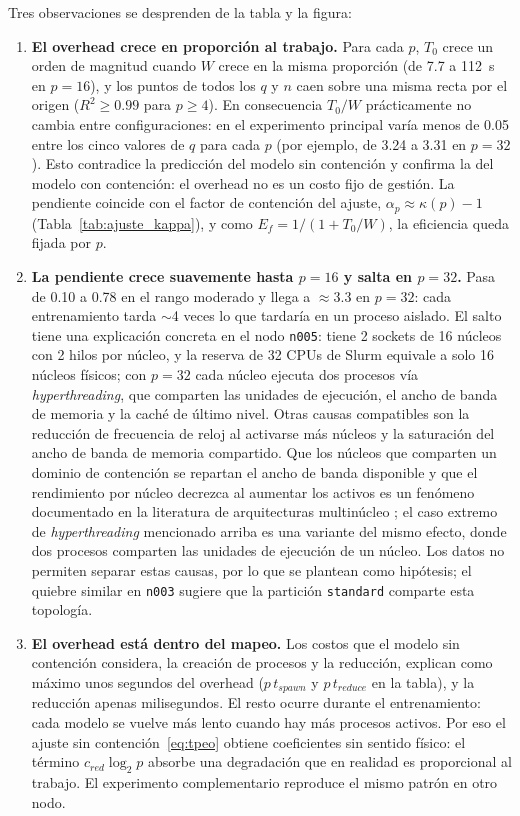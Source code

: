 \documentclass[11pt, a4paper]{article}
\begin{document}
Tres observaciones se desprenden de la tabla y la figura:

\begin{enumerate}
    \item \textbf{El overhead crece en proporción al trabajo.} Para cada $p$, $T_0$ crece un orden de magnitud cuando $W$ crece en la misma proporción (de 7.7 a 112~s en $p=16$), y los puntos de todos los $q$ y $n$ caen sobre una misma recta por el origen ($R^2 \ge 0.99$ para $p \ge 4$). En consecuencia $T_0/W$ prácticamente no cambia entre configuraciones: en el experimento principal varía menos de 0.05 entre los cinco valores de $q$ para cada $p$ (por ejemplo, de 3.24 a 3.31 en $p = 32$). Esto contradice la predicción del modelo sin contención y confirma la del modelo con contención: el overhead no es un costo fijo de gestión. La pendiente coincide con el factor de contención del ajuste, $\alpha_p \approx \kappa(p)-1$ (Tabla~\ref{tab:ajuste_kappa}), y como $E_f = 1/(1+T_0/W)$, la eficiencia queda fijada por $p$.
    \item \textbf{La pendiente crece suavemente hasta $p = 16$ y salta en $p = 32$.} Pasa de 0.10 a 0.78 en el rango moderado y llega a $\approx 3.3$ en $p = 32$: cada entrenamiento tarda $\sim$4 veces lo que tardaría en un proceso aislado. El salto tiene una explicación concreta en el nodo \texttt{n005}: tiene 2 sockets de 16 núcleos con 2 hilos por núcleo, y la reserva de 32 CPUs de Slurm equivale a solo 16 núcleos físicos; con $p = 32$ cada núcleo ejecuta dos procesos vía \textit{hyperthreading}, que comparten las unidades de ejecución, el ancho de banda de memoria y la caché de último nivel. Otras causas compatibles son la reducción de frecuencia de reloj al activarse más núcleos y la saturación del ancho de banda de memoria compartido. Que los núcleos que comparten un dominio de contención se repartan el ancho de banda disponible y que el rendimiento por núcleo decrezca al aumentar los activos es un fenómeno documentado en la literatura de arquitecturas multinúcleo \cite{afzal2020bandwidth}; el caso extremo de \textit{hyperthreading} mencionado arriba es una variante del mismo efecto, donde dos procesos comparten las unidades de ejecución de un núcleo. Los datos no permiten separar estas causas, por lo que se plantean como hipótesis; el quiebre similar en \texttt{n003} sugiere que la partición \texttt{standard} comparte esta topología.
    \item \textbf{El overhead está dentro del mapeo.} Los costos que el modelo sin contención considera, la creación de procesos y la reducción, explican como máximo unos segundos del overhead ($p\,t_{spawn}$ y $p\,t_{reduce}$ en la tabla), y la reducción apenas milisegundos. El resto ocurre durante el entrenamiento: cada modelo se vuelve más lento cuando hay más procesos activos. Por eso el ajuste sin contención~\eqref{eq:tpeo} obtiene coeficientes sin sentido físico: el término $c_{red}\log_2 p$ absorbe una degradación que en realidad es proporcional al trabajo. El experimento complementario reproduce el mismo patrón en otro nodo.
\end{enumerate}
\end{document}
